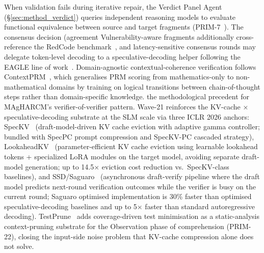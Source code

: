 When validation fails during iterative repair, the Verdict Panel Agent
(§\ref{sec:method_verdict}) queries independent reasoning models
to evaluate functional equivalence between source and target fragments
(PRIM-7~\cite{p08_matchfixagent,p108_eagle3_2025}). The consensus decision (agreement
Vulnerability-aware fragments additionally cross-reference the
RedCode benchmark~\cite{p61_redcode}, and latency-sensitive
consensus rounds may delegate token-level decoding to a
speculative-decoding helper following the EAGLE line of
work~\cite{p64_eagle,p93_rafailov_dpo_2023,p78_eagle3_2025,p108_eagle3_2025,p91_snell_test_time_scaling_2024,p114_cai_medusa_2024}.
Domain-agnostic contextual-coherence verification follows ContextPRM~\cite{p146_zhang_contextprm_2026}, which generalises PRM scoring from mathematics-only to non-mathematical domains by training on logical transitions between chain-of-thought steps rather than domain-specific knowledge.
the methodological precedent for MAgHARCM's verifier-of-verifier pattern.
Wave-21 reinforces the KV-cache × speculative-decoding substrate at the SLM scale via three ICLR 2026 anchors: SpecKV~\cite{p147_galim_speckv_2026} (draft-model-driven KV cache eviction with adaptive gamma controller; bundled with SpecPC prompt compression and SpecKV-PC cascaded strategy), LookaheadKV~\cite{p148_ahn_lookaheadkv_2026} (parameter-efficient KV cache eviction using learnable lookahead tokens + specialized LoRA modules on the target model, avoiding separate draft-model generation; up to 14.5$\times$ eviction cost reduction vs.\ SpecKV-class baselines), and SSD/Saguaro~\cite{p149_kumar_ssd_saguaro_2026} (asynchronous draft-verify pipeline where the draft model predicts next-round verification outcomes while the verifier is busy on the current round; Saguaro optimised implementation is 30\% faster than optimised speculative-decoding baselines and up to 5$\times$ faster than standard autoregressive decoding). TestPrune~\cite{p150_chen_testprune_2026} adds coverage-driven test minimisation as a static-analysis context-pruning substrate for the Observation phase of comprehension (PRIM-22), closing the input-side noise problem that KV-cache compression alone does not solve.

